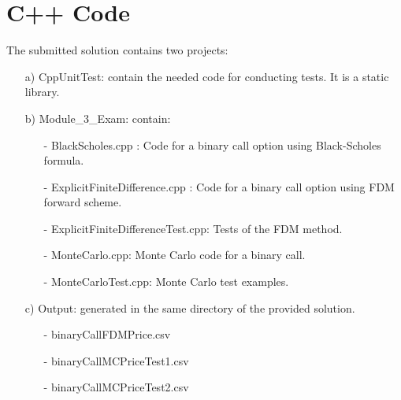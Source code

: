 \documentclass[11pt,oneside,a4paper, titlepage]{article}
\begin{document}
\section*{C++ Code}
The submitted solution contains two projects:
\begin{enumerate}
\item[a)] CppUnitTest: contain the needed code for conducting tests. It is a static library.
\item[b)] Module\_3\_Exam: contain:
\begin{enumerate}
\item[-] BlackScholes.cpp : Code for a binary call option using Black-Scholes formula.
\item[-] ExplicitFiniteDifference.cpp : Code for a binary call option using FDM forward scheme.
\item[-] ExplicitFiniteDifferenceTest.cpp: Tests of the FDM method.
\item[-] MonteCarlo.cpp: Monte Carlo code for a binary call.
\item[-] MonteCarloTest.cpp: Monte Carlo test examples.
\end{enumerate}
\item[c)] Output: generated in the same directory of the provided solution.
\begin{enumerate}
\item[-] binaryCallFDMPrice.csv
\item[-] binaryCallMCPriceTest1.csv
\item[-] binaryCallMCPriceTest2.csv
\end{enumerate}
\end{enumerate}
\end{document}
